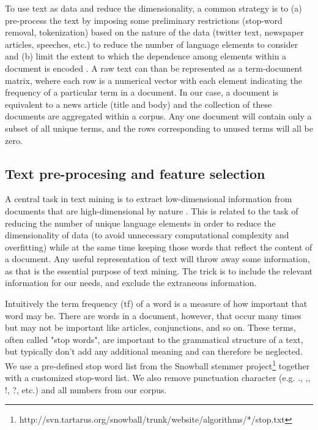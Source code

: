 \documentclass[12pt,a4paper,notitlepage]{article}
\begin{document}
To use text as data and reduce the dimensionality, a common strategy is to (a) pre-process the text by imposing some preliminary restrictions (stop-word removal, tokenization) based on the nature of the data (twitter text, newspaper articles, speeches, etc.) to reduce the number of language elements to consider and (b) limit the extent to which the dependence among elements within a document is encoded \citep{gentzkow_text_2017}. A raw text can than be represented as a term-document matrix, wehere each row is a numerical vector with each element indicating the frequency of a particular term in a document. In our case, a document is equivalent to a news article (title and body) and the collection of these documents are aggregated within a corpus. Any one document will contain only a subset of all unique terms, and the rows corresponding to unused terms will all be zero. 

\subsection{Text pre-procesing and feature selection}

A central task in text mining is to extract low-dimensional information from documents that are high-dimensional by nature \citep{bholat_text_2015}. This is related to the task of reducing the number of unique language elements in order to reduce the dimensionality of data (to avoid unnecessary computational complexity and overfitting) while at the same time keeping those words that reflect the content of a document. Any useful representation of text will throw away some information, as that is the essential purpose of text mining. The trick is to include the relevant information for our needs, and exclude the extraneous information. 

Intuitively the term frequency (tf) of a word is a measure of how important that word may be. There are words in a document, however, that occur many times but may not be important like articles, conjunctions, and so on. These terms, often called "stop words", are important to the grammatical structure of a text, but typically don't add any additional meaning and can therefore be neglected. We use a pre-defined stop word list from the Snowball stemmer project\footnote{http://svn.tartarus.org/snowball/trunk/website/algorithms/*/stop.txt} together with a customized stop-word list. We also remove punctuation character (e.g. ., ,, !, ?, etc.) and all numbers from our corpus.  
\end{document}

